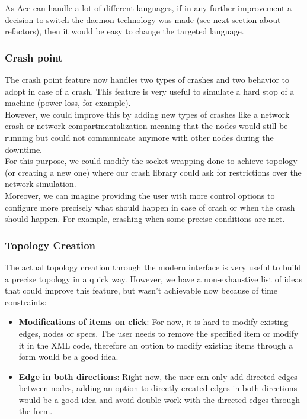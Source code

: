 \documentclass{eplmastersthesis}
\begin{document}
        As Ace can handle a lot of different languages, if in any further
        improvement a decision to switch the daemon technology was made (see
        next section about refactors), then it would be easy to change the
        targeted language.

        \subsubsection{Crash point}

          The crash point feature now handles two types of crashes and two
          behavior to adopt in case of a crash. This feature is very useful
          to simulate a hard stop of a machine (power loss, for example).\\
          However, we could improve this by adding new types of crashes like a
          network crash or network compartmentalization meaning that the
          nodes would still be running but could not communicate anymore
          with other nodes during the downtime.\\
          For this purpose, we could modify the socket wrapping done to achieve
          topology (or creating a new one) where our crash library could ask
          for restrictions over the network simulation.\\

          Moreover, we can imagine providing the user with more control options
          to configure more precisely what should happen in case of crash or
          when the crash should happen. For example, crashing when some
          precise conditions are met.

        \subsubsection{Topology Creation}

          The actual topology creation through the modern interface is very
          useful to build a precise topology in a quick way. However, we have
          a non-exhaustive list of ideas that could improve this feature, but
          wasn't achievable now because of time constraints:

          \begin{itemize}
            \item \textbf{Modifications of items on click}: For now, it is hard
            to modify existing edges, nodes or specs. The user needs to remove
            the specified item or modify it in the XML code, therefore
            an option to modify existing items through a form would be a good
            idea.
            \item \textbf{Edge in both directions}: Right now, the user can only
            add directed edges between nodes, adding an option to directly
            created edges in both directions would be a good idea and
            avoid double work with the directed edges through the form.
          \end{itemize}
\end{document}
